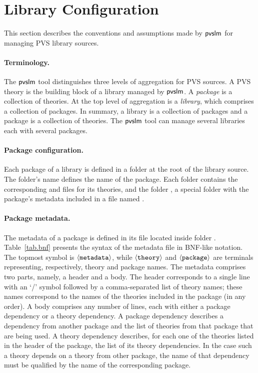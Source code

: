 \section{Library Configuration}
\label{sec.conf}

This section describes the conventions and assumptions made by
$\textsf{pvslm}$ for managing PVS library sources.

\paragraph{Terminology.}
The $\textsf{pvslm}$ tool distinguishes three levels of aggregation for PVS
sources. A PVS theory is the building block of a library managed by
$\textsf{pvslm}$. A {\em package} is a collection of theories. At the top
level of aggregation is a {\em library}, which comprises a collection
of packages. In summary, a library is a collection of packages and a
package is a collection of theories. The $\textsf{pvslm}$ tool can manage
several libraries each with several packages.

\paragraph{Package configuration.}
Each package of a library is defined in a folder at the root of the
library source. The folder's name defines the name of the
package. Each folder contains the corresponding  and
 files for its theories, and the folder , a
special folder with the package's metadata included in a file named
. 

\paragraph{Package metadata.} The metadata of a package is defined
in its  file located inside folder
. Table~\ref{tab.bnf} presents the syntax of the metadata
file in BNF-like notation. The topmost symbol is
$\langle{\texttt{metadata}}\rangle$, while $\langle{\texttt{theory}}\rangle$ and
$\langle{\texttt{package}}\rangle$ are terminals representing, respectively,
theory and package names. The metadata comprises two parts, namely, a
header and a body. The header corresponds to a single line with an `/'
symbol followed by a comma-separated list of theory names; these names
correspond to the names of the theories included in the package (in
any order). A body comprises any number of lines, each with either a
package dependency or a theory dependency. A package dependency
describes a dependency from another package and the list of theories
from that package that are being used. A theory dependency describes,
for each one of the theories listed in the header of the package, the
list of its theory dependencies. In the case such a theory depends on
a theory from other package, the name of that dependency must be
qualified by the name of the corresponding package.

